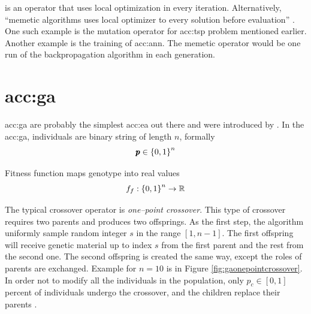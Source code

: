  is an operator that uses local optimization in every iteration. Alternatively, \enquote{memetic algorithms uses local optimizer to every solution before evaluation} \citep{HowToSolveItModernHeuristics}. One such example is the mutation operator for \acrlong{acc:tsp} problem mentioned earlier. Another example is the training of \acrshort{acc:ann}. The memetic operator would be one run of the backpropagation algorithm in each generation.




\section{\texorpdfstring{\acrlong*{acc:ga}}{Genetic Algorithms}}

\acrfull{acc:ga} are probably the simplest \acrfull{acc:ea} out there and were introduced by \citet{HollandGA}. In the \acrshort{acc:ga}, individuals are binary string of length $n$, formally
$$ \pmb{p} \in \left\{0,1\right\}^{n} $$

Fitness function maps genotype into real values
$$ f_f:\left\{0,1\right\}^{n}\rightarrow\mathbb{R} $$

The typical crossover operator is \emph{one--point crossover}. This type of crossover requires two parents and produces two offsprings. As the first step, the algorithm uniformly sample random integer $s$ in the range $\left[ 1, n-1 \right]$. The first offspring will receive genetic material up to index $s$ from the first parent and the rest from the second one. The second offspring is created the same way, except the roles of parents are exchanged. Example for $n=10$ is in Figure \ref{fig:gaonepointcrossover}. In order not to modify all the individuals in the population, only $p_c\in\left[0,1\right]$ percent of individuals undergo the crossover, and the children replace their parents \citep{IntroductionToEA}.

